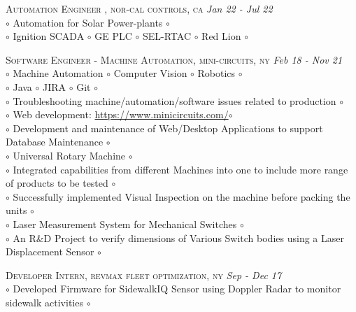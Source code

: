 \documentclass[a4paper]{article}
\begin{document}
\begin{spacing}{0.1}
\end{spacing}
%
\textsc	{	Automation Engineer	, nor-cal controls, ca																					} \hfill \emph {Jan 22 - Jul 22	}	\\
		{	$\circ$	Automation for Solar Power-plants  $\circ$																					}	\\
		{	$\circ$	Ignition SCADA $\circ$ GE PLC $\circ$ SEL-RTAC $\circ$ Red Lion $\circ$													}	\\
%
\begin{spacing}{0.1}
\end{spacing}
\textsc	{	Software Engineer - Machine Automation, mini-circuits, ny																		} \hfill \emph {Feb 18 - Nov 21	}	\\
		{	$\circ$ Machine Automation $\circ$ Computer Vision $\circ$ Robotics $\circ$									}	\\
		{	$\circ$ Java $\circ$	JIRA $\circ$ Git $\circ$													}	\\
		{	$\circ$ Troubleshooting machine/automation/software issues related to production $\circ$																	}	\\
		{	$\circ$ Web development: \href{https://www.minicircuits.com/}{https://www.minicircuits.com/}$\circ$										}	\\
		{	$\circ$ Development and maintenance of Web/Desktop Applications to support Database Maintenance $\circ$													}	\\
		{	$\circ$ Universal Rotary Machine $\circ$																									}	\\
		{	$\circ$ Integrated capabilities from different Machines into one to include more range of products to be tested $\circ$												}	\\
		{	$\circ$ Successfully implemented Visual Inspection on the machine before packing the units $\circ$															}	\\
		{	$\circ$ Laser Measurement System for Mechanical Switches $\circ$																			}	\\
		{	$\circ$ An R\&D Project to verify dimensions of Various Switch bodies using a Laser Displacement Sensor $\circ$													}	\\
%
\begin{spacing}{0.1}
\end{spacing}
\textsc	{	Developer Intern, revmax fleet optimization, ny																						} \hfill \emph {Sep - Dec 17	}	\\
		{	$\circ$ Developed Firmware for SidewalkIQ Sensor using Doppler Radar to monitor sidewalk activities $\circ$													}	\\
\end{document}
